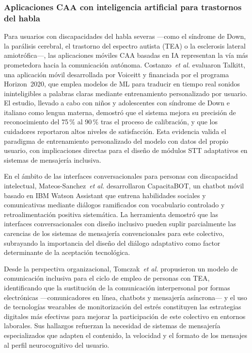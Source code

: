 \documentclass[journal]{IEEEtran}
\begin{document}
			\subsubsection{Aplicaciones CAA con inteligencia artificial para trastornos del habla}
				Para usuarios con discapacidades del habla severas ---como el s\'indrome de Down, la par\'alisis cerebral, el trastorno del espectro autista (TEA) o la esclerosis lateral amiotr\'ofica---, las aplicaciones m\'oviles CAA basadas en IA representan la v\'ia m\'as prometedora hacia la comunicaci\'on aut\'onoma. Costanzo~\textit{et al.} \cite{costanzo2023} evaluaron Talkitt, una aplicaci\'on m\'ovil desarrollada por Voiceitt y financiada por el programa Horizon~2020, que emplea modelos de ML para traducir en tiempo real sonidos ininteligibles a palabras claras mediante entrenamiento personalizado por usuario. El estudio, llevado a cabo con ni\~nos y adolescentes con s\'indrome de Down e italiano como lengua materna, demostr\'o que el sistema mejora su precisi\'on de reconocimiento del 75\,\% al 90\,\% tras el proceso de calibraci\'on, y que los cuidadores reportaron altos niveles de satisfacci\'on. Esta evidencia valida el paradigma de entrenamiento personalizado del modelo con datos del propio usuario, con implicaciones directas para el dise\~no de m\'odulos STT adaptativos en sistemas de mensajer\'ia inclusiva.
				
				En el \'ambito de las interfaces conversacionales para personas con discapacidad intelectual, Mateos-Sanchez~\textit{et al.} \cite{mateos2022} desarrollaron CapacitaBOT, un chatbot m\'ovil basado en IBM Watson Assistant que entrena habilidades sociales y comunicativas mediante di\'alogos ramificados con vocabulario controlado y retroalimentaci\'on positiva sistem\'atica. La herramienta demostr\'o que las interfaces conversacionales con dise\~no inclusivo pueden suplir parcialmente las carencias de los sistemas de mensajer\'ia convencionales para este colectivo, subrayando la importancia del dise\~no del di\'alogo adaptativo como factor determinante de la aceptaci\'on tecnol\'ogica.
				
				Desde la perspectiva organizacional, Tomczak~\textit{et al.} \cite{tomczak2021} propusieron un modelo de comunicaci\'on inclusiva para el ciclo de empleo de personas con TEA, identificando que la sustituci\'on de la comunicaci\'on interpersonal por formas electr\'onicas ---comunicadores en l\'inea, chatbots y mensajer\'ia as\'incrona--- y el uso de tecnolog\'ias wearables de monitorizaci\'on del estr\'es constituyen las estrategias digitales m\'as efectivas para mejorar la participaci\'on de este colectivo en entornos laborales. Sus hallazgos refuerzan la necesidad de sistemas de mensajer\'ia especializados que adapten el contenido, la velocidad y el formato de los mensajes al perfil neurocognitivo del usuario.
				
\end{document}
